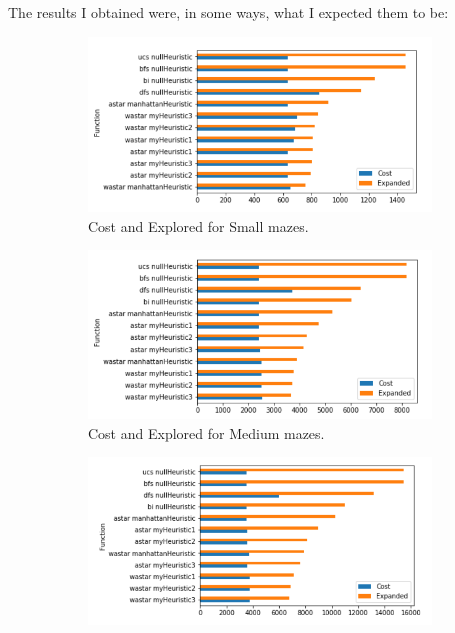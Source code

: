 \documentclass[a4paper,12pt]{report}
\begin{document}
The results I obtained were, in some ways, what I expected them to be:

\vspace{0.5cm}
\begin{figure}[h!]
  \centering
  \begin{subfigure}[b]{0.45\linewidth}
    \includegraphics[width=\linewidth]{pictures/small/small1.png}
    \caption{Cost and Explored for Small mazes.}
  \end{subfigure}
  \begin{subfigure}[b]{0.45\linewidth}
    \includegraphics[width=\linewidth]{pictures/medium/small1.png}
    \caption{Cost and Explored for Medium mazes.}
  \end{subfigure}
 \begin{subfigure}[b]{0.45\linewidth}
    \includegraphics[width=\linewidth]{pictures/large/small1.png}

\end{subfigure}
\end{figure}
\end{document}
